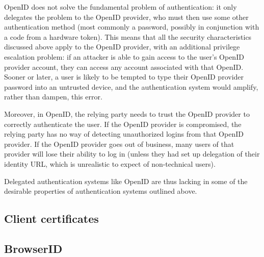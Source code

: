 OpenID does not solve the fundamental problem of authentication: it only delegates the problem to
the OpenID provider, who must then use some other authentication method (most commonly a password,
possibly in conjunction with a code from a hardware token). This means that all the security
characteristics discussed above apply to the OpenID provider, with an additional privilege
escalation problem: if an attacker is able to gain access to the user's OpenID provider account,
they can access any account associated with that OpenID. Sooner or later, a user is likely to be
tempted to type their OpenID provider password into an untrusted device, and the authentication
system would amplify, rather than dampen, this error.

Moreover, in OpenID, the relying party needs to trust the OpenID provider to correctly authenticate
the user. If the OpenID provider is compromised, the relying party has no way of detecting
unauthorized logins from that OpenID provider. If the OpenID provider goes out of business, many
users of that provider will lose their ability to log in (unless they had set up delegation of their
identity URL, which is unrealistic to expect of non-technical users).

Delegated authentication systems like OpenID are thus lacking in some of the desirable properties of
authentication systems outlined above.

\subsection{Client certificates}
\subsection{BrowserID}

